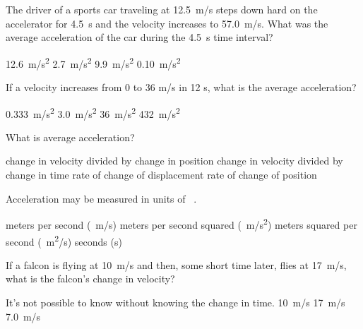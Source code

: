 \documentclass{exam}
\begin{document}
\begin{questions}






\question %
The driver of a sports car traveling at \SI{12.5}{m/s} steps down hard on the accelerator for \SI{4.5}{s} and the velocity increases to \SI{57.0}{m/s}. What was the average acceleration of the car during the \SI{4.5}{s} time interval?

\begin{choices}
\choice \SI{12.6}{m/s^2}
\choice \SI{2.7}{m/s^2}
\CorrectChoice \SI{9.9}{m/s^2}
\choice \SI{0.10}{m/s^2}
\end{choices}

\question %
If a velocity increases from 0 to 36 m/s in 12 s, what is the average acceleration?

\begin{choices}
\choice \SI{0.333}{m/s^2}
\CorrectChoice \SI{3.0}{m/s^2}
\choice \SI{36}{m/s^2}
\choice \SI{432}{m/s^2}
\end{choices}

\question
What is average acceleration?

\begin{choices}
    \choice change in velocity divided by change in position
    \correctchoice change in velocity divided by change in time
    \choice rate of change of displacement
    \choice rate of change of position
\end{choices}

\question
Acceleration may be measured in units of \fillin\ .

\begin{choices}
    \choice meters per second (\SI{}{m/s})
    \correctchoice meters per second squared (\SI{}{m/s^2})
    \choice meters squared per second (\SI{}{m^2/s})
    \choice seconds (s)
\end{choices}

\question
If a falcon is flying at \SI{10}{m/s} and then, some short time later, flies at \SI{17}{m/s}, what is the falcon's change in velocity?

\begin{choices}
    \choice It's not possible to know without knowing the change in time.
    \choice \SI{10}{m/s}
    \choice \SI{17}{m/s}
    \correctchoice \SI{7.0}{m/s}
\end{choices}


\end{questions}
\end{document}
